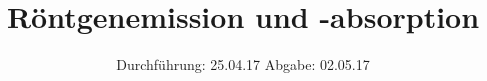 

\subject{V603}
\title{Röntgenemission und -absorption}
\date{
  Durchführung: 25.04.17
  \hspace{3em}
  Abgabe: 02.05.17
}



\maketitle
\thispagestyle{empty}
\tableofcontents
\newpage



%


\printbibliography


